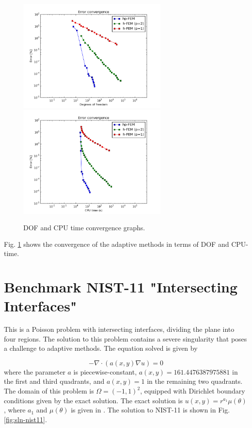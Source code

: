 \documentclass[12pt]{elsarticle}
\begin{document}
\begin{figure}[H]
\centering
\vspace{-3mm}
\hspace{-50mm}
\includegraphics[width=7.5cm]{nist/nist-10/conv_dof_aniso.png}\ \
\hspace{-10mm}
\includegraphics[width=7.5cm]{nist/nist-10/conv_cpu_aniso.png}
\hspace{-50mm}
\vspace{-3mm}
\caption{DOF and CPU time convergence graphs.}
\label{fig:nist-10-conv}
\end{figure}

Fig. \ref{fig:nist-10-conv} shows the convergence of the adaptive methods in terms of DOF and CPU-time.


\section{Benchmark NIST-11 "Intersecting Interfaces"}
\label{sec:bench-11}

This is a Poisson problem with intersecting interfaces,
dividing the plane into four regions.
The solution to this problem contains a severe
singularity that poses a challenge to adaptive methods.
The equation solved is given by

\begin{equation} \label{intersecting}
-\nabla \cdot (a(x,y) \nabla u) = 0
\end{equation}
where the parameter $a$ is piecewise-constant,
$a(x,y) = 161.4476387975881$ in the first and third quadrants,
and $a(x,y) = 1$ in the remaining two quadrants.
The domain of this problem is $\Omega = (-1, 1)^2$, equipped with
Dirichlet boundary conditions given by the exact solution.
The exact solution is
$u(x,y) = r^{a_1} \mu (\theta)$,
where $a_1$ and $\mu (\theta)$ is given in \cite{mitchell-1}.
The solution to NIST-11 is shown in Fig. \ref{fig:sln-nist11}.
\end{document}
